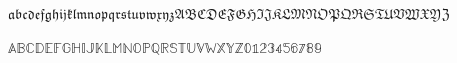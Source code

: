\documentclass[a4paper]{scrartcl}
\newcommand*{\pkg}[1]{\texttt{#1}}
\newcommand*{\file}[1]{\texttt{#1}}
\newcommand*{\opt}[1]{\texttt{#1}}
\newcommand{\abc}{abcdefghijklmnopqrstuvwxyz}
\newcommand{\ABC}{ABCDEFGHIJKLMNOPQRSTUVWXYZ}
\newcommand{\samplenumbers}{0123456789}
\newcommand*{\hlabel}[1]{\phantomsection\label{#1}}
\begin{document}
$\mathfrak{\abc\ABC}$

$\mathbb{\ABC\samplenumbers}$
%
%
%
%
%
%
%
\end{document}
